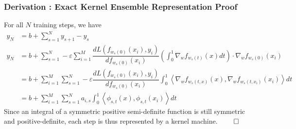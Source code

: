 \begin{frame}
  \frametitle{Derivation : Exact Kernel Ensemble Representation Proof}

For all $N$ training steps, we have
\begin{align*}
y_N &= b + \sum_{s=1}^N y_{s+1} - y_s\\
y_N &= b + \sum_{s = 1}^N -\varepsilon \sum_{i = 1}^{M} \dfrac{d
      L(f_{w_s(0)}(x_i),  y_i)}{d f_{w_s(0)}(x_i)}
      \left(\int_0^1\nabla_w f_{w_s(t)}(x)dt\right) \cdot \nabla_w
      f_{w_s(0)}(x_i)\\   \label{eqint}
&= b + \sum_{i = 1}^{M}\sum_{s = 1}^N -\varepsilon  \dfrac{d L(f_{w_s(0)}(x_i),  y_i)}{d f_{w_s(0)}(x_i)}  \int_0^1\left\langle \nabla_w f_{w_s(t,x)}(x), \nabla_w f_{w_s(t,x_i)}(x_i) \right\rangle dt\\ 
&= b + \sum_{i = 1}^{M}\sum_{s = 1}^N a_{i, s}  \int_0^1 \left\langle \phi_{s,t}(x), \phi_{s,t}(x_i)\right\rangle dt
\end{align*}
Since an integral of a symmetric positive semi-definite function is
still symmetric and positive-definite, each step is thus represented
by a kernel machine.  $\qed$

\end{frame}



